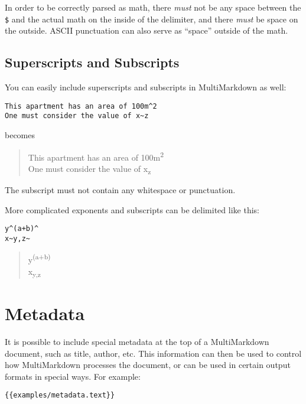 In order to be correctly parsed as math, there \emph{must} not be any space between the \texttt{\$} and the actual math on the inside of the delimiter, and there \emph{must} be space on the outside. ASCII punctuation can also serve as ``space'' outside of the math.

\subsection{Superscripts and Subscripts }
\label{superscriptsandsubscripts}

You can easily include superscripts and subscripts in MultiMarkdown as well:

\begin{verbatim}
This apartment has an area of 100m^2
One must consider the value of x~z
\end{verbatim}

becomes

\begin{quote}
This apartment has an area of 100m\textsuperscript{2}\\
One must consider the value of x\textsubscript{z}
\end{quote}

The subscript must not contain any whitespace or punctuation.

More complicated exponents and subscripts can be delimited like this:

\begin{verbatim}
y^(a+b)^
x~y,z~
\end{verbatim}

\begin{quote}
y\textsuperscript{(a+b)}\\
x\textsubscript{y,z}
\end{quote}

\section{Metadata }
\label{metadata}

It is possible to include special metadata at the top of a MultiMarkdown
document, such as title, author, etc. This information can then be used to
control how MultiMarkdown processes the document, or can be used in certain
output formats in special ways. For example:

\begin{verbatim}
{{examples/metadata.text}}
\end{verbatim}

